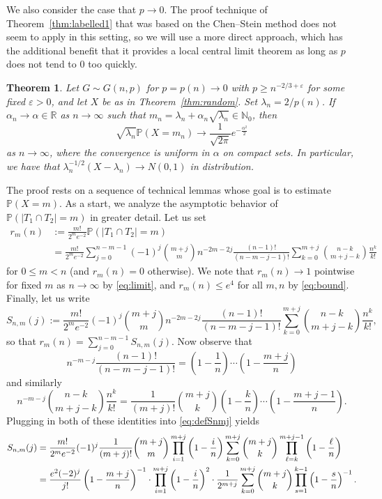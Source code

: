 \documentclass[a4paper,12pt,reqno]{amsart}
\newtheorem{theorem}[lemma]{Theorem}
\theoremstyle{remark}
\newcommand{\IP}{\mathbb{P}}
\newcommand{\ga}{\alpha}
\newcommand{\gep}{\varepsilon}
\newcommand{\gl}{\lambda}
\newcommand{\IN}{\mathbb{N}}
\newcommand{\IR}{\mathbb{R}}
\begin{document}
We also consider the case that $p\to0$. The proof technique of Theorem~\ref{thm:labelled1} that was based on the Chen--Stein method does not seem to apply in this setting, so we will use a more direct approach, which has the additional benefit that it provides a local central limit theorem as long as $p$ does not tend to $0$ too quickly. 
\begin{theorem}\label{thm:pto0}
 Let $G\sim G(n,p)$ for $p=p(n)\to 0$ with $p\geq n^{-2/3+\gep}$ for some fixed $\gep > 0$, and let $X$ be as in Theorem~\ref{thm:random}. Set $\gl_n=2/p(n)$. If $\ga_n \to \ga\in\IR$ as $n\to\infty$ such that $m_n=\gl_n+\ga_n\sqrt{\gl_n}\in \IN_0$, then 
 \begin{equation}\label{eq:LCLT}
  \sqrt{\gl_n} \IP(X=m_n) \to \frac{1}{\sqrt{2\pi}} e^{-\frac{\ga^2}{2}}
 \end{equation}
 as $n\to\infty$, where the convergence is uniform in $\ga$ on compact sets. In particular, we have that $\gl_n^{-1/2}(X-\gl_n) \to N(0,1)$ in distribution.
\end{theorem}

The proof rests on a sequence of technical lemmas whose goal is to estimate $\IP(X=m)$. 
As a start, we analyze the asymptotic behavior of $\IP(|T_1\cap T_2|=m)$ in greater detail. Let us set
 \begin{align*}
  r_m(n)
  &:=\frac{m!}{2^m e^{-2}} \IP(|T_1\cap T_2|=m) \\
  &=\frac{m!}{2^m e^{-2}} \sum_{j=0}^{n-m-1} (-1)^j \binom{m+j}{m} n^{-2m-2j} \frac{(n-1)!}{(n-m-j-1)!} \sum_{k=0}^{m+j} \binom{n-k}{m+j-k} \frac{n^k}{k!}
 \end{align*}
for $0 \leq m < n$ (and $r_m(n) = 0$ otherwise). We note that $r_m(n)\to 1$ pointwise for fixed $m$ as $n\to\infty$ by \eqref{eq:limit}, and $r_m(n)\leq e^4$ for all $m,n$ by \eqref{eq:bound}. Finally, let us write
 \begin{equation}\label{eq:defSnmj}
  S_{n,m}(j) := \frac{m!}{2^m e^{-2}}(-1)^j \binom{m+j}{m} n^{-2m-2j} \frac{(n-1)!}{(n-m-j-1)!} \sum_{k=0}^{m+j} \binom{n-k}{m+j-k} \frac{n^k}{k!},
 \end{equation}
 so that $r_m(n) = \sum_{j=0}^{n-m-1} S_{n,m}(j)$. Now observe that 
 \[
  n^{-m-j} \frac{(n-1)!}{(n-m-j-1)!} = \left(1-\frac{1}{n}\right)\cdots \left(1-\frac{m+j}{n}\right)
 \]
 and similarly
 \[
  n^{-m-j}\binom{n-k}{m+j-k} \frac{n^k}{k!} = \frac{1}{(m+j)!}\binom{m+j}{k} \left(1-\frac{k}{n}\right) \cdots \left( 1-\frac{m+j-1}{n}\right).
 \]
 Plugging in both of these identities into \eqref{eq:defSnmj} yields
 \begin{align*}\label{eq:Taylor}
  S_{n,m}(j)
  &= \frac{m!}{2^m e^{-2}} (-1)^j \frac{1}{(m+j)!} \binom{m+j}{m} \prod_{i=1}^{m+j} \left(1-\frac{i}{n}\right) \sum_{k=0}^{m+j} \binom{m+j}{k} \prod_{\ell=k}^{m+j-1} \left(1-\frac{\ell}{n}\right)\notag\\
  &= \frac{e^2(-2)^j}{j!} \left(1-\frac{m+j}{n}\right)^{-1} \cdot \prod_{i=1}^{m+j} \left(1-\frac{i}{n}\right)^2 \cdot \frac{1}{2^{m+j}} \sum_{k=0}^{m+j} \binom{m+j}{k} \prod_{s=1}^{k-1} \left(1-\frac{s}{n}\right)^{-1}.
 \end{align*}
\end{document}
